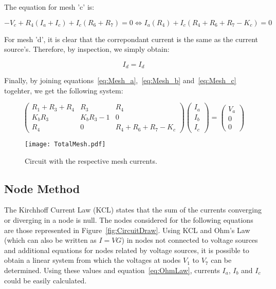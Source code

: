 The equation for mesh 'c' is:

\begin{equation}
  -V_c+R_4(I_a+I_c)+I_c(R_6+R_7)=0 \Leftrightarrow I_a(R_4)+I_c(R_4+R_6+R_7-K_c)=0
  \label{eq:Mesh_c}
\end{equation}

For mesh 'd', it is clear that the correpondant current is the same as the current source's. Therefore, by inspection, we simply obtain:

\begin{equation}
  I_d=I_d
  \label{eq:Mesh_d}
\end{equation}

Finally, by joining equations~\ref{eq:Mesh_a},~\ref{eq:Mesh_b} and~\ref{eq:Mesh_c} togehter, we get the following system:

\begin{equation}
  \begin{pmatrix}
    R_1+R_3+R_4 & R_3 & R_4 \\
    K_bR_3 & K_bR_3-1 & 0 \\
    R_4 & 0 & R_4+R_6+R_7-K_c
  \end{pmatrix}
  \begin{pmatrix}
    I_a  \\
    I_b  \\
    I_c
  \end{pmatrix}
  =
  \begin{pmatrix}
    V_a  \\
    0  \\
    0
  \end{pmatrix}
  \label{eq:LinearSystem1}
\end{equation}

\begin{figure}[H] \centering
  \texttt{[image: TotalMesh.pdf]}
  \caption{Circuit with the respective mesh currents.}
  \label{fig:TotalMesh}
\end{figure}


\subsection{Node Method}

The Kirchhoff Current Law (KCL) states that the sum of the currents converging or diverging in a node is null. The nodes considered for the following equations are those represented in Figure~\ref{fig:CircuitDraw}. Using KCL and Ohm's Law (which can also be written as $I=VG$) in nodes not connected to voltage sources and additional equations for nodes related by voltage sources, it is possible to obtain a linear system from which the voltages at nodes $V_1$ to $V_7$ can be determined. Using these values and equation~\ref{eq:OhmLaw}, currents $I_a$, $I_b$ and $I_c$ could be easily calculated.

